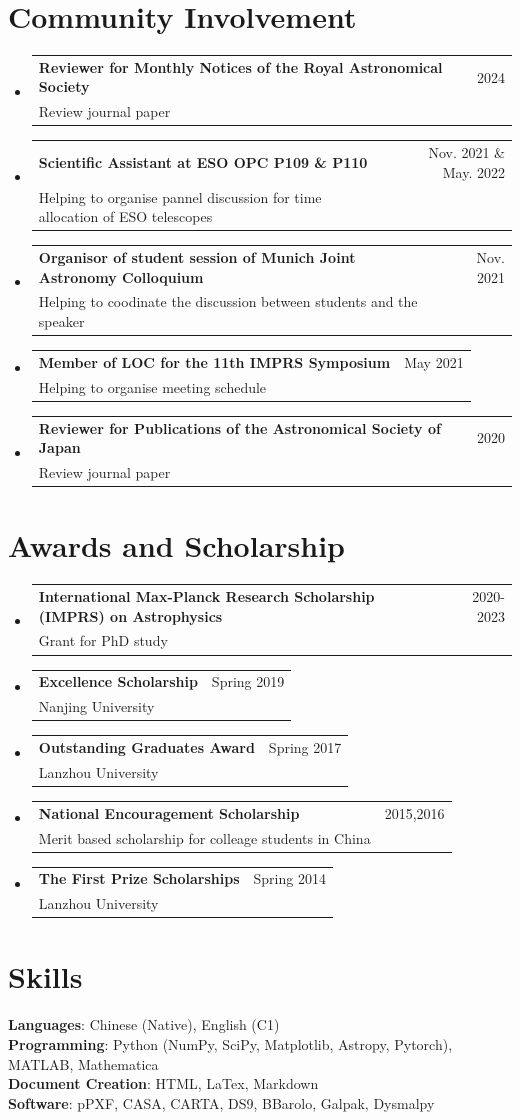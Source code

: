 \documentclass[A4,11pt]{article}
\makeatletter
\newcommand{\CVSubheading}[4]{
  \vspace{-2pt}\item
    \begin{tabular*}{0.97\textwidth}[t]{l@{\extracolsep{\fill}}r}
      \textbf{#1} & #2 \\
      \small#3 & \small #4 \\
    \end{tabular*}\vspace{-7pt}
}
\newcommand{\CVSubHeadingListStart}{\begin{itemize}[leftmargin=0.5cm, label={}]}
\newcommand{\CVSubHeadingListEnd}{\end{itemize}}
\makeatother
\begin{document}
\section{Community Involvement}
  \CVSubHeadingListStart
    \CVSubheading
      {Reviewer for Monthly Notices of the Royal Astronomical Society}{2024}
      {Review journal paper}{}
    \CVSubheading
      {Scientific Assistant at ESO OPC P109 \& P110}{Nov. 2021 \& May. 2022}
      {Helping to organise pannel discussion for time allocation of ESO telescopes}{}
    \CVSubheading
      {Organisor of student session of Munich Joint Astronomy Colloquium}{Nov. 2021}
      {Helping to coodinate the discussion between students and the speaker}{}
    \CVSubheading
      {Member of LOC for the 11th IMPRS Symposium}{May 2021}
      {Helping to organise meeting schedule}{}

    \CVSubheading
      {Reviewer for Publications of the Astronomical Society of Japan}{2020}
      {Review journal paper}{}
  \CVSubHeadingListEnd

\section{Awards and Scholarship}
  \CVSubHeadingListStart
    \CVSubheading
      {International Max-Planck Research Scholarship (IMPRS) on Astrophysics}{2020-2023}
      {Grant for PhD study}{}
    \CVSubheading
      {Excellence Scholarship}{Spring 2019}
      {Nanjing University}{}
    \CVSubheading
      {Outstanding Graduates Award}{Spring 2017}
      {Lanzhou University}{}
    \CVSubheading
      {National Encouragement Scholarship}{2015,2016}
      {Merit based scholarship for colleage students in China}{}
    \CVSubheading
      {The First Prize Scholarships}{Spring 2014}
      {Lanzhou University}{}
  \CVSubHeadingListEnd

\section{Skills}
 \begin{itemize}[leftmargin=0.5cm, label={}]
    \small{\item{
     \textbf{Languages}{: Chinese (Native), English (C1)} \\
     \textbf{Programming}{: Python (NumPy, SciPy, Matplotlib, Astropy, Pytorch), MATLAB, Mathematica} \\
     \textbf{Document Creation}{: HTML, LaTex, Markdown} \\
     \textbf{Software}{: pPXF, CASA, CARTA, DS9, BBarolo, Galpak, Dysmalpy}
    }}
 \end{itemize}
\end{document}
